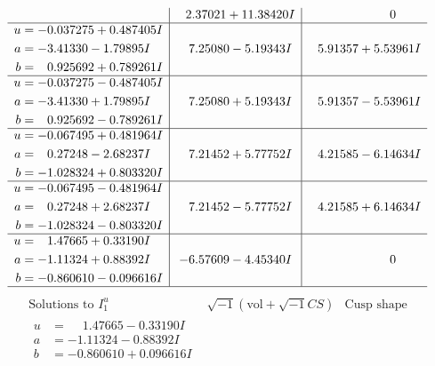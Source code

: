 \documentclass[1p]{elsarticle_modified}
\theoremstyle{definition}
\newcommand{\I}{\sqrt{-1}}
\begin{document}
$$\begin{array}{c|c|c}
 & \phantom{-}2.37021 + 11.38420 I & \phantom{-0.000000 } 0 \\ \hline\begin{aligned}
u &= -0.037275 + 0.487405 I \\
a &= -3.41330 - 1.79895 I \\
b &= \phantom{-}0.925692 + 0.789261 I\end{aligned}
 & \phantom{-}7.25080 - 5.19343 I & \phantom{-}5.91357 + 5.53961 I \\ \hline\begin{aligned}
u &= -0.037275 - 0.487405 I \\
a &= -3.41330 + 1.79895 I \\
b &= \phantom{-}0.925692 - 0.789261 I\end{aligned}
 & \phantom{-}7.25080 + 5.19343 I & \phantom{-}5.91357 - 5.53961 I \\ \hline\begin{aligned}
u &= -0.067495 + 0.481964 I \\
a &= \phantom{-}0.27248 - 2.68237 I \\
b &= -1.028324 + 0.803320 I\end{aligned}
 & \phantom{-}7.21452 + 5.77752 I & \phantom{-}4.21585 - 6.14634 I \\ \hline\begin{aligned}
u &= -0.067495 - 0.481964 I \\
a &= \phantom{-}0.27248 + 2.68237 I \\
b &= -1.028324 - 0.803320 I\end{aligned}
 & \phantom{-}7.21452 - 5.77752 I & \phantom{-}4.21585 + 6.14634 I \\ \hline\begin{aligned}
u &= \phantom{-}1.47665 + 0.33190 I \\
a &= -1.11324 + 0.88392 I \\
b &= -0.860610 - 0.096616 I\end{aligned}
 & -6.57609 - 4.45340 I & \phantom{-0.000000 } 0\\
 \hline 
 \end{array}$$\newpage$$\begin{array}{c|c|c}  
\text{Solutions to }I^u_{1}& \I (\text{vol} + \sqrt{-1}CS) & \text{Cusp shape}\\
 \hline 
\begin{aligned}
u &= \phantom{-}1.47665 - 0.33190 I \\
a &= -1.11324 - 0.88392 I \\
b &= -0.860610 + 0.096616 I\end{aligned}

\end{array}$$
\end{document}
